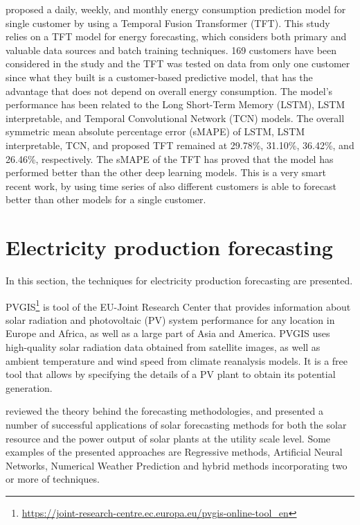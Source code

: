 \cite{NAZIR2023100888} proposed a daily, weekly, and monthly energy consumption prediction model for single customer by using a Temporal Fusion Transformer (TFT).
This study relies on a TFT model for energy forecasting, which considers both primary and valuable data sources and batch training techniques.
169 customers have been considered in the study and the TFT was tested on data from only one customer since what they built is a customer-based predictive model, that has the advantage that does not depend on overall energy consumption.
The model’s performance has been related to the Long Short-Term Memory (LSTM), LSTM interpretable, and Temporal Convolutional Network (TCN) models.
The overall symmetric mean absolute percentage error (sMAPE) of LSTM, LSTM interpretable, TCN, and proposed TFT remained at 29.78\%, 31.10\%, 36.42\%, and 26.46\%, respectively.
The sMAPE of the TFT has proved that the model has performed better than the other deep learning models.
This is a very smart recent work, by using time series of also different customers is able to forecast better than other models for a single customer.


\section{Electricity production forecasting}
\label{sec:productionsoa}
\vspace{0.2 cm}

In this section, the techniques for electricity production forecasting are presented.

PVGIS\footnote{ \url{https://joint-research-centre.ec.europa.eu/pvgis-online-tool_en} } is tool of the EU-Joint Research Center that provides information about solar radiation and photovoltaic (PV) system performance for any location in Europe and Africa, as well as a large part of Asia and America.
PVGIS uses high-quality solar radiation data obtained from satellite images, as well as ambient temperature and wind speed from climate reanalysis models.
It is a free tool that allows by specifying the details of a PV plant to obtain its potential generation.

\cite{INMAN2013535} reviewed the theory behind the forecasting methodologies, and presented a number of successful applications of solar forecasting methods for both the solar resource and the power output of solar plants at the utility scale level.
Some examples of the presented approaches are Regressive methods, Artificial Neural Networks, Numerical Weather Prediction and hybrid methods incorporating two or more of techniques.

